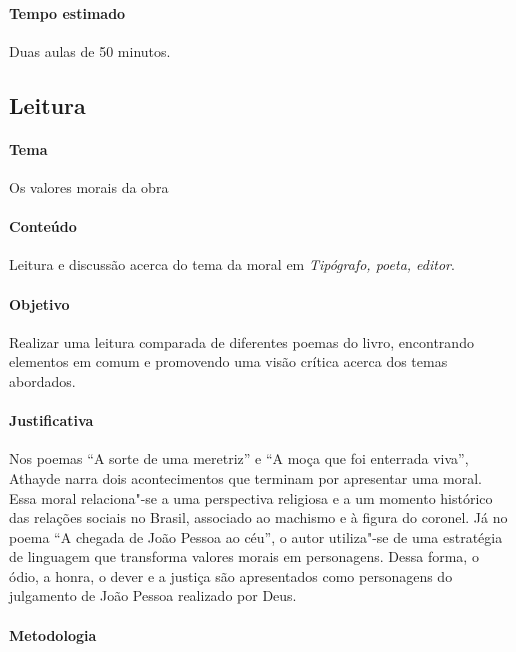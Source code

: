 \documentclass[12pt]{extarticle}
\begin{document}
\paragraph{Tempo estimado} Duas aulas de 50 minutos.




\subsection{Leitura}

\paragraph{Tema} Os valores morais da obra

\paragraph{Conteúdo} Leitura e discussão acerca do tema da moral em
\emph{Tipógrafo, poeta, editor}.

\paragraph{Objetivo} Realizar uma leitura comparada de diferentes poemas do
livro, encontrando elementos em comum e promovendo uma visão crítica acerca dos
temas abordados.

\paragraph{Justificativa} Nos poemas ``A sorte de uma meretriz'' e ``A moça que
foi enterrada viva'', Athayde narra dois acontecimentos que terminam por
apresentar uma moral. Essa moral relaciona"-se a uma perspectiva religiosa
e a um momento histórico das relações sociais no Brasil, associado ao machismo
e à figura do coronel. Já no poema ``A chegada de João Pessoa ao céu'', o autor
utiliza"-se de uma estratégia de linguagem que transforma valores morais em
personagens. Dessa forma, o ódio, a honra, o dever e a justiça são apresentados
como personagens do julgamento de João Pessoa realizado por Deus. 

\paragraph{Metodologia}
\end{document}
